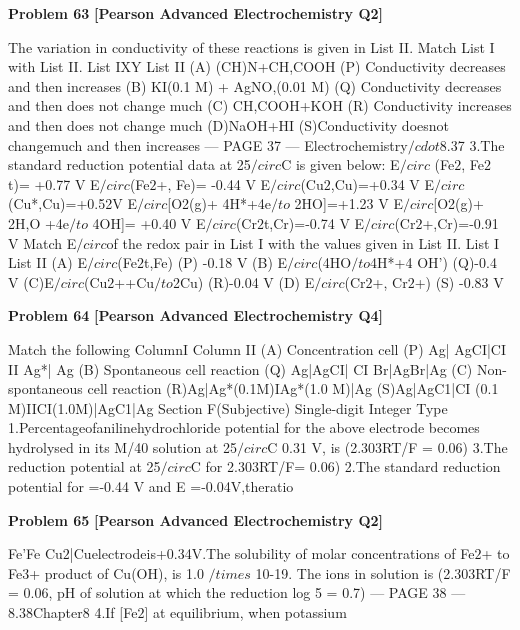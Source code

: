 \begin{problembox}
\textbf{Problem 63} \hfill \textbf{[Pearson Advanced Electrochemistry Q2]}
\label{q:ext-pearson-63}

The variation in conductivity of these reactions is given in List II. Match List I with List II.
List IXY
List II
(A) (CH)N+CH,COOH
(P) Conductivity decreases and then increases
(B) KI(0.1 M) + AgNO,(0.01 M)
(Q) Conductivity decreases and then does not
change much
(C) CH,COOH+KOH
(R) Conductivity increases and then does not
change much
(D)NaOH+HI
(S)Conductivity doesnot changemuch and then
increases
--- PAGE 37 ---
Electrochemistry$/cdot$8.37
3.The standard reduction potential data at 25$/circ$C is given below:
E$/circ$ (Fe$2$, Fe$2$t)= +0.77 V
E$/circ$(Fe$2$+, Fe)= -0.44 V
E$/circ$(Cu$2$,Cu)=+0.34 V
E$/circ$(Cu*,Cu)=+0.52V
E$/circ$[O2(g)+ 4H*+4e$/to$ 2HO]=+1.23 V
E$/circ$[O2(g)+ 2H,O +4e$/to$ 4OH]= +0.40 V
E$/circ$(Cr$2$t,Cr)=-0.74 V
E$/circ$(Cr$2$+,Cr)=-0.91 V
Match E$/circ$of the redox pair in List I with the values given in List II.
List I
List II
(A) E$/circ$(Fe$2$t,Fe)
(P) -0.18 V
(B) E$/circ$(4HO$/to$4H*+4 OH')
(Q)-0.4 V
(C)E$/circ$(Cu$2$++Cu$/to$2Cu)
(R)-0.04 V
(D) E$/circ$(Cr$2$+, Cr$2$+)
(S) -0.83 V
\end{problembox}

\begin{problembox}
\textbf{Problem 64} \hfill \textbf{[Pearson Advanced Electrochemistry Q4]}
\label{q:ext-pearson-64}

Match the following
ColumnI
Column II
(A) Concentration cell
(P) Ag| AgCI|CI II Ag*| Ag
(B) Spontaneous cell reaction
(Q) Ag|AgCI| CI  Br|AgBr|Ag
(C) Non-spontaneous cell reaction
(R)Ag|Ag*(0.1M)IAg*(1.0 M)|Ag
(S)Ag|AgC1|CI (0.1 M)IICI(1.0M)|AgC1|Ag
Section F(Subjective)
Single-digit Integer Type
1.Percentageofanilinehydrochloride
potential for the above electrode becomes
hydrolysed in its M/40 solution at 25$/circ$C
0.31 V, is (2.303RT/F = 0.06)
3.The reduction potential at 25$/circ$C for
2.303RT/F= 0.06)
2.The standard reduction potential for
=-0.44 V and E
=-0.04V,theratio
\end{problembox}

\begin{problembox}
\textbf{Problem 65} \hfill \textbf{[Pearson Advanced Electrochemistry Q2]}
\label{q:ext-pearson-65}

Fe'Fe
Cu$2$|Cuelectrodeis+0.34V.The solubility
of molar concentrations of Fe$2$+ to Fe3+
product of Cu(OH), is 1.0 $/times$ 10-19. The
ions in solution is (2.303RT/F = 0.06,
pH of solution at which the reduction
log 5 = 0.7)
--- PAGE 38 ---
8.38Chapter8
4.If [Fe$2$] at equilibrium, when potassium
\end{problembox}


